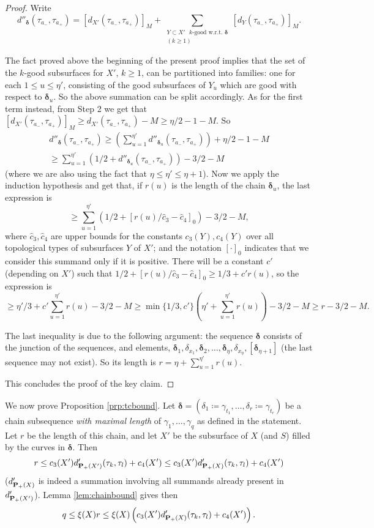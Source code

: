 \begin{proof}
Write
$$d''_{\bm\delta}(\tau_{a_-},\tau_{a_+})= [d_{X'}(\tau_{a_-},\tau_{a_+})]_M + \sum_{\substack{Y\subset {X'}\text{ }k \text{-good w.r.t. }\bm\delta \\ (k\geq 1)}} [d_Y(\tau_{a_-},\tau_{a_+})]_M.$$

The fact proved above the beginning of the present proof implies that the set of the $k$-good subsurfaces for ${X'}$, $k\geq 1$, can be partitioned into families: one for each $1\leq u\leq \eta'$, consisting of the good subsurfaces of $Y_u$ which are good with respect to $\bm\delta_u$. So the above summation can be split accordingly. As for the first term instead, from Step 2 we get that $[d_{X'}(\tau_{a_-},\tau_{a_+})]_M\geq d_{X'}(\tau_{a_-},\tau_{a_+}) - M \geq \eta/2 - 1 -M$. So
\begin{eqnarray*}
 & d''_{\bm\delta}(\tau_{a_-},\tau_{a_+}) \geq \left(\sum_{u=1}^{\eta'} d''_{\bm\delta_u}(\tau_{a_-},\tau_{a_+})\right) + \eta/2 - 1 -M & \\
 & \geq \sum_{u=1}^{\eta'} \left(1/2 + d''_{\bm\delta_u}(\tau_{a_-},\tau_{a_+})\right) - 3/2 -M & 
\end{eqnarray*}
(where we are also using the fact that $\eta\leq \eta'\leq \eta+1$). Now we apply the induction hypothesis and get that, if $r(u)$ is the length of the chain $\bm\delta_u$, the last expression is
$$
\geq \sum_{u=1}^{\eta'} \left(1/2 + [r(u)/\hat c_3 - \hat c_4]_0\right) - 3/2 -M,
$$
where $\hat c_3, \hat c_4$ are upper bounds for the constants $c_3(Y), c_4(Y)$ over all topological types of subsurfaces $Y$ of ${X'}$; and the notation $[\cdot]_0$ indicates that we consider this summand only if it is positive. There will be a constant $c'$ (depending on ${X'}$) such that $1/2 + [r(u)/\hat c_3 - \hat c_4]_0\geq 1/3 +c' r(u)$, so the expression is 
$$
\geq \eta'/3 + c'\sum_{u=1}^{\eta'} r(u) - 3/2 -M \geq \min\{1/3,c'\}\left(\eta'+\sum_{u=1}^{\eta'} r(u)\right) -3/2 -M \geq r -3/2 -M.
$$

The last inequality is due to the following argument: the sequence $\bm\delta$ consists of the junction of the sequences, and elements, $\bm\delta_1,\delta_{x_1},\bm\delta_2,\ldots,\bm\delta_\eta,\delta_{x_\eta},[\bm\delta_{\eta+1}]$ (the last sequence may not exist). So its length is $r=\eta+\sum_{u=1}^{\eta'} r(u)$.

This concludes the proof of the key claim.
\end{proof}

We now prove Proposition \ref{prp:tcbound}. Let $\bm\delta=(\delta_1\coloneqq\gamma_{t_1},\ldots,\delta_r\coloneqq\gamma_{t_r})$ be a chain subsequence \emph{with maximal length} of $\gamma_1,\ldots,\gamma_q$ as defined in the statement. Let $r$ be the length of this chain, and let $X'$ be the subsurface of $X$ (and $S$) filled by the curves in $\bm\delta$. Then
$$r\leq c_3(X') d'_{{\mathbf{P}_+}(X')}(\tau_k,\tau_l)+c_4(X')\leq c_3(X') d'_{{\mathbf{P}_+}(X)}(\tau_k,\tau_l)+c_4(X')$$
($d'_{{\mathbf{P}_+}(X)}$ is indeed a summation involving all summands already present in $d'_{{\mathbf{P}_+}(X')}$). Lemma \ref{lem:chainbound} gives then
$$
q\leq \xi(X)r \leq \xi(X)\left( c_3(X') d'_{{\mathbf{P}_+}(X)}(\tau_k,\tau_l)+c_4(X') \right).
$$

